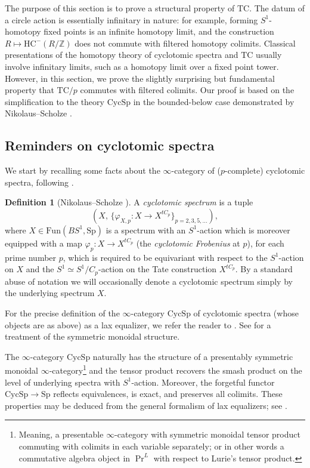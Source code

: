 \documentclass{amsart}
\newcommand{\HC}{\mathrm{HC}}
\newcommand{\Sp}{\mathrm{Sp}}
\newcommand{\fun}{\mathrm{Fun}}
\theoremstyle{definition}
\newtheorem{definition}{Definition}[section]
\newcommand{\CycSp}{\mathrm{CycSp}}
\newcommand{\TC}{\mathrm{TC}}
\begin{document}
The purpose of this section is to prove a structural property of $\TC$. 
The datum of a circle action is essentially infinitary in nature: for example,
forming $S^1$-homotopy fixed points is an infinite homotopy limit, and the
construction $R \mapsto \HC^-(R/\mathbb{Z})$ does not
commute with filtered homotopy colimits.
Classical presentations of the homotopy
theory of cyclotomic spectra and $\TC$ usually involve infinitary limits, such
as 
a homotopy limit over a fixed point tower. 
However, in this section, we prove the slightly surprising but fundamental  property that $\TC/p$ commutes with filtered
colimits. Our proof is based on the simplification to the theory
$\CycSp$ in the bounded-below case demonstrated by Nikolaus--Scholze
\cite{nikolaus-scholze}.  

\subsection{Reminders on cyclotomic spectra}\label{subsection_reminders}
We start by recalling some facts about the $\infty$-category of ($p$-complete) cyclotomic spectra, following \cite{nikolaus-scholze}. 

\begin{definition}[Nikolaus--Scholze \cite{nikolaus-scholze}] 
A {\em cyclotomic spectrum} is a tuple  $$ (X ,  \, \{\varphi_{X, p}: X  \to X^{tC_p}\}_{p = 2, 3, 5, \dots
}),$$ where $X \in \fun(BS^1, \Sp)$ is a spectrum with an $S^1$-action which is moreover equipped with a map $\varphi_p:X\to X^{tC_p}$ (the {\em cyclotomic Frobenius} at $p$), for each prime number $p$, which is required to be equivariant with respect to the $S^1$-action on $X$ and the $S^1\simeq S^1/C_p$-action on the Tate construction $X^{tC_p}$. By a standard abuse of notation we will occasionally denote a cyclotomic spectrum simply by the underlying spectrum $X$.

For the precise definition of the $\infty$-category $\CycSp$ of cyclotomic
spectra (whose objects are as above) as a lax equalizer, we refer the reader to
\cite[II.1]{nikolaus-scholze}. See \cite[IV.2]{nikolaus-scholze} for a treatment
of the symmetric monoidal structure. 
\end{definition} 

The $\infty$-category $\CycSp$ naturally has the structure of a presentably
symmetric monoidal $\infty$-category\footnote{Meaning, a presentable $\infty$-category with symmetric monoidal tensor product commuting with colimits in each variable separately; or in other words a commutative algebra object in $\operatorname{Pr}^L$ with respect to Lurie's tensor product.} and the tensor product recovers the smash
product on the level of underlying spectra with $S^1$-action. Moreover, the
forgetful functor $\CycSp\to \Sp$ reflects equivalences, is exact, and preserves
all colimits. These properties may be deduced from the general formalism of lax equalizers; see \cite[II.1]{nikolaus-scholze}.
\end{document}
